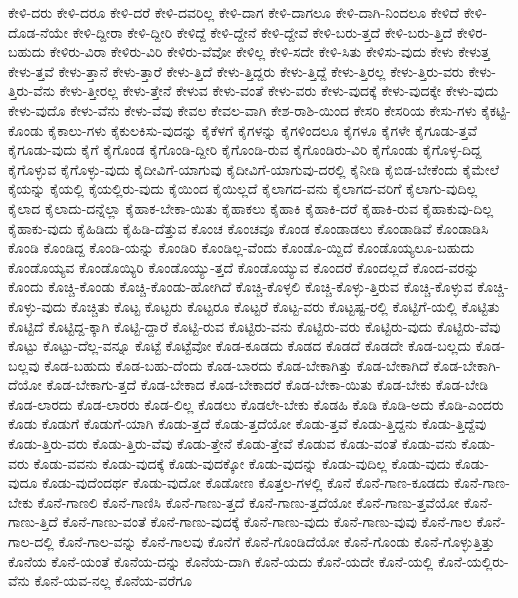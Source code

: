 {ಕೇಳಿ-ದರು
ಕೇಳಿ-ದರೂ
ಕೇಳಿ-ದರೆ
ಕೇಳಿ-ದವರಿಲ್ಲ
ಕೇಳಿ-ದಾಗ
ಕೇಳಿ-ದಾಗಲೂ
ಕೇಳಿ-ದಾಗಿ-ನಿಂದಲೂ
ಕೇಳಿದೆ
ಕೇಳಿ-ದೊಡ-ನೆಯೇ
ಕೇಳಿ-ದ್ದೀರಾ
ಕೇಳಿ-ದ್ದೀರಿ
ಕೇಳಿದ್ದೆ
ಕೇಳಿ-ದ್ದೇನೆ
ಕೇಳಿ-ದ್ದೇವೆ
ಕೇಳಿ-ಬರು-ತ್ತದೆ
ಕೇಳಿ-ಬರು-ತ್ತಿದೆ
ಕೇಳಿರ-ಬಹುದು
ಕೇಳಿರು-ವಿರಾ
ಕೇಳಿರು-ವಿರಿ
ಕೇಳಿರು-ವೆವೋ
ಕೇಳಿಲ್ಲ
ಕೇಳಿ-ಸದೇ
ಕೇಳಿ-ಸಿತು
ಕೇಳಿಸು-ವುದು
ಕೇಳು
ಕೇಳುತ್ತ
ಕೇಳು-ತ್ತವೆ
ಕೇಳು-ತ್ತಾನೆ
ಕೇಳು-ತ್ತಾರೆ
ಕೇಳು-ತ್ತಿದೆ
ಕೇಳು-ತ್ತಿದ್ದರು
ಕೇಳು-ತ್ತಿದ್ದೆ
ಕೇಳು-ತ್ತಿರಲ್ಲ
ಕೇಳು-ತ್ತಿರು-ವರು
ಕೇಳು-ತ್ತಿರು-ವೆನು
ಕೇಳು-ತ್ತೀರಲ್ಲ
ಕೇಳು-ತ್ತೇನೆ
ಕೇಳುವ
ಕೇಳು-ವಂತೆ
ಕೇಳು-ವರು
ಕೇಳು-ವುದಕ್ಕೆ
ಕೇಳು-ವುದಕ್ಕೇ
ಕೇಳು-ವುದು
ಕೇಳು-ವುದೊ
ಕೇಳು-ವೆನು
ಕೇಳು-ವೆವು
ಕೇವಲ
ಕೇವಲ-ವಾಗಿ
ಕೇಶ-ರಾಶಿ-ಯಿಂದ
ಕೇಸರಿ
ಕೇಸರಿಯ
ಕೇಸು-ಗಳು
ಕೈಕಟ್ಟಿ-ಕೊಂಡು
ಕೈಕಾಲು-ಗಳು
ಕೈಕುಲಕಿಸು-ವುದನ್ನು
ಕೈಕೆಳಗೆ
ಕೈಗಳನ್ನು
ಕೈಗಳಿಂದಲೂ
ಕೈಗಳೂ
ಕೈಗಳೇ
ಕೈಗೂಡು-ತ್ತವೆ
ಕೈಗೂಡು-ವುದು
ಕೈಗೆ
ಕೈಗೊಂಡ
ಕೈಗೊಂಡಿ-ದ್ದೀರಿ
ಕೈಗೊಂಡಿ-ರುವ
ಕೈಗೊಂಡಿರು-ವಿರಿ
ಕೈಗೊಂಡು
ಕೈಗೊಳ್ಳ-ದಿದ್ದ
ಕೈಗೊಳ್ಳುವ
ಕೈಗೊಳ್ಳು-ವುದು
ಕೈದೀವಿಗೆ-ಯಾಗುವು
ಕೈದೀವಿಗೆ-ಯಾಗುವು-ದರಲ್ಲಿ
ಕೈನೀಡಿ
ಕೈಬಿಡ-ಬೇಕೆಂದು
ಕೈಮೇಲೆ
ಕೈಯನ್ನು
ಕೈಯಲ್ಲಿ
ಕೈಯಲ್ಲಿರು-ವುದು
ಕೈಯಿಂದ
ಕೈಯಿಲ್ಲದೆ
ಕೈಲಾಗದ-ವನು
ಕೈಲಾಗದ-ವರಿಗೆ
ಕೈಲಾಗು-ವುದಿಲ್ಲ
ಕೈಲಾದ
ಕೈಲಾದು-ದನ್ನೆಲ್ಲಾ
ಕೈಹಾಕ-ಬೇಕಾ-ಯಿತು
ಕೈಹಾಕಲು
ಕೈಹಾಕಿ
ಕೈಹಾಕಿ-ದರೆ
ಕೈಹಾಕಿ-ರುವ
ಕೈಹಾಕುವು-ದಿಲ್ಲ
ಕೈಹಾಕು-ವುದು
ಕೈಹಿಡಿದು
ಕೈಹಿಡಿ-ದೆತ್ತುವ
ಕೊಂಚ
ಕೊಂಚವೂ
ಕೊಂಡ
ಕೊಂಡಾಡಲು
ಕೊಂಡಾಡಿವೆ
ಕೊಂಡಾಡಿಸಿ
ಕೊಂಡಿ
ಕೊಂಡಿದ್ದ
ಕೊಂಡಿ-ಯನ್ನು
ಕೊಂಡಿರಿ
ಕೊಂಡಿಲ್ಲ-ವೆಂದು
ಕೊಂಡೊ-ಯ್ದಿದೆ
ಕೊಂಡೊಯ್ಯಲೂ-ಬಹುದು
ಕೊಂಡೊಯ್ಯವ
ಕೊಂಡೊಯ್ಯಿರಿ
ಕೊಂಡೊಯ್ಯು-ತ್ತದೆ
ಕೊಂಡೊಯ್ಯುವ
ಕೊಂದರೆ
ಕೊಂದಲ್ಲದೆ
ಕೊಂದ-ವರನ್ನು
ಕೊಂದು
ಕೊಚ್ಚಿ-ಕೊಂಡು
ಕೊಚ್ಚಿ-ಕೊಂಡು-ಹೋಗಿದೆ
ಕೊಚ್ಚಿ-ಕೊಳ್ಳಲಿ
ಕೊಚ್ಚಿ-ಕೊಳ್ಳು-ತ್ತಿರುವ
ಕೊಚ್ಚಿ-ಕೊಳ್ಳುವ
ಕೊಚ್ಚಿ-ಕೊಳ್ಳು-ವುದು
ಕೊಚ್ಚಿತು
ಕೊಟ್ಟ
ಕೊಟ್ಟರು
ಕೊಟ್ಟರೂ
ಕೊಟ್ಟರೆ
ಕೊಟ್ಟ-ವರು
ಕೊಟ್ಟಷ್ಟ-ರಲ್ಲಿ
ಕೊಟ್ಟಿಗೆ-ಯಲ್ಲಿ
ಕೊಟ್ಟಿತು
ಕೊಟ್ಟಿದೆ
ಕೊಟ್ಟಿದ್ದ-ಕ್ಕಾಗಿ
ಕೊಟ್ಟಿ-ದ್ದಾರೆ
ಕೊಟ್ಟಿ-ರುವ
ಕೊಟ್ಟಿರು-ವನು
ಕೊಟ್ಟಿರು-ವರು
ಕೊಟ್ಟಿರು-ವುದು
ಕೊಟ್ಟಿರು-ವೆವು
ಕೊಟ್ಟು
ಕೊಟ್ಟು-ದೆಲ್ಲ-ವನ್ನೂ
ಕೊಟ್ಟೆ
ಕೊಟ್ಟೆವೋ
ಕೊಡ-ಕೂಡದು
ಕೊಡದ
ಕೊಡದೆ
ಕೊಡದೇ
ಕೊಡ-ಬಲ್ಲದು
ಕೊಡ-ಬಲ್ಲವು
ಕೊಡ-ಬಹುದು
ಕೊಡ-ಬಹು-ದೆಂದು
ಕೊಡ-ಬಾರದು
ಕೊಡ-ಬೇಕಾಗಿತ್ತು
ಕೊಡ-ಬೇಕಾಗಿದೆ
ಕೊಡ-ಬೇಕಾಗಿ-ದೆಯೋ
ಕೊಡ-ಬೇಕಾಗು-ತ್ತದೆ
ಕೊಡ-ಬೇಕಾದ
ಕೊಡ-ಬೇಕಾದರೆ
ಕೊಡ-ಬೇಕಾ-ಯಿತು
ಕೊಡ-ಬೇಕು
ಕೊಡ-ಬೇಡಿ
ಕೊಡ-ಲಾರದು
ಕೊಡ-ಲಾರರು
ಕೊಡ-ಲಿಲ್ಲ
ಕೊಡಲು
ಕೊಡಲೇ-ಬೇಕು
ಕೊಡಹಿ
ಕೊಡಿ
ಕೊಡಿ-ಅದು
ಕೊಡಿ-ಎಂದರು
ಕೊಡು
ಕೊಡುಗೆ
ಕೊಡುಗೆ-ಯಾಗಿ
ಕೊಡು-ತ್ತದೆ
ಕೊಡು-ತ್ತದೆಯೋ
ಕೊಡು-ತ್ತವೆ
ಕೊಡು-ತ್ತಿದ್ದನು
ಕೊಡು-ತ್ತಿದ್ದೆವು
ಕೊಡು-ತ್ತಿರು-ವರು
ಕೊಡು-ತ್ತಿರು-ವೆವು
ಕೊಡು-ತ್ತೇನೆ
ಕೊಡು-ತ್ತೇವೆ
ಕೊಡುವ
ಕೊಡು-ವಂತೆ
ಕೊಡು-ವನು
ಕೊಡು-ವರು
ಕೊಡು-ವವನು
ಕೊಡು-ವುದಕ್ಕೆ
ಕೊಡು-ವುದಕ್ಕೋ
ಕೊಡು-ವುದನ್ನು
ಕೊಡು-ವುದಿಲ್ಲ
ಕೊಡು-ವುದು
ಕೊಡು-ವುದೂ
ಕೊಡು-ವುದೆಂದರ್ಥ
ಕೊಡು-ವುದೋ
ಕೊಡೋಣ
ಕೊತ್ತಲ-ಗಳಲ್ಲಿ
ಕೊನೆ
ಕೊನೆ-ಗಾಣ-ಕೂಡದು
ಕೊನೆ-ಗಾಣ-ಬೇಕು
ಕೊನೆ-ಗಾಣಲಿ
ಕೊನೆ-ಗಾಣಿಸಿ
ಕೊನೆ-ಗಾಣು-ತ್ತದೆ
ಕೊನೆ-ಗಾಣು-ತ್ತದೆಯೋ
ಕೊನೆ-ಗಾಣು-ತ್ತವೆಯೋ
ಕೊನೆ-ಗಾಣು-ತ್ತಿದೆ
ಕೊನೆ-ಗಾಣು-ವಂತೆ
ಕೊನೆ-ಗಾಣು-ವುದಕ್ಕೆ
ಕೊನೆ-ಗಾಣು-ವುದು
ಕೊನೆ-ಗಾಣು-ವುವು
ಕೊನೆ-ಗಾಲ
ಕೊನೆ-ಗಾಲ-ದಲ್ಲಿ
ಕೊನೆ-ಗಾಲ-ವನ್ನು
ಕೊನೆ-ಗಾಲವು
ಕೊನೆಗೆ
ಕೊನೆ-ಗೊಂಡಿದೆಯೋ
ಕೊನೆ-ಗೊಂಡು
ಕೊನೆ-ಗೊಳ್ಳುತ್ತಿತ್ತು
ಕೊನೆಯ
ಕೊನೆ-ಯಂತೆ
ಕೊನೆಯ-ದನ್ನು
ಕೊನೆಯ-ದಾಗಿ
ಕೊನೆ-ಯದು
ಕೊನೆ-ಯದೇ
ಕೊನೆ-ಯಲ್ಲಿ
ಕೊನೆ-ಯಲ್ಲಿರು-ವೆನು
ಕೊನೆ-ಯವ-ನಲ್ಲ
ಕೊನೆಯ-ವರೆಗೂ
}
